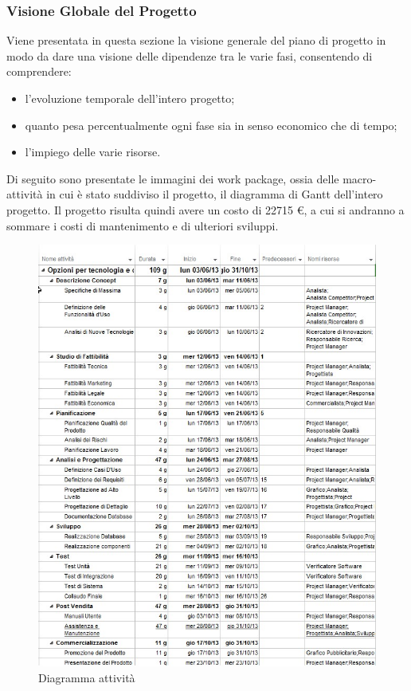 \subsubsection{Visione Globale del Progetto}
Viene presentata in questa sezione la visione generale del piano di progetto in modo da
dare una visione delle dipendenze tra le varie fasi, consentendo di comprendere:
\begin{itemize}
\item l'evoluzione temporale dell'intero progetto;
\item quanto pesa percentualmente ogni fase sia in senso economico che di tempo;
\item l'impiego delle varie risorse.
\end{itemize}
Di seguito sono presentate le immagini dei work package, ossia delle macro-attività in cui
è stato suddiviso il progetto, il diagramma di Gantt dell'intero progetto.
Il progetto risulta quindi avere un costo di 22715 \euro{}, a cui si andranno a
sommare i costi di mantenimento e di ulteriori sviluppi.

\begin{figure}[H]
\begin{center}
\includegraphics[width=1\textwidth]{img/Attivitanuovo.jpg}
\caption{Diagramma  attività}
\label{fig:Diagramma attività}
\end{center}
\end{figure}

